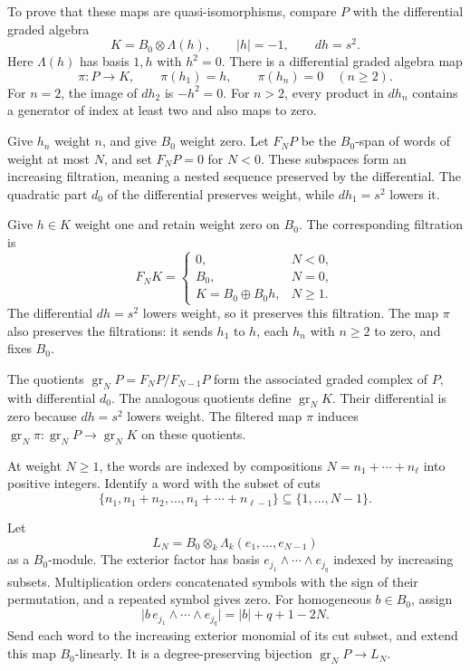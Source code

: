To prove that these maps are quasi-isomorphisms, compare $P$ with
the differential graded algebra
\[
 K=B_0\otimes\Lambda(h),\qquad |h|=-1,\qquad dh=s^2.
\]
Here $\Lambda(h)$ has basis $1,h$ with $h^2=0$.
There is a differential graded algebra map
\[
 \pi:P\longrightarrow K,\qquad
 \pi(h_1)=h,\qquad\pi(h_n)=0\quad(n\geq2).
\]
For $n=2$, the image of $dh_2$ is $-h^2=0$.
For $n>2$, every product in $dh_n$ contains a generator of index
at least two and also maps to zero.

Give $h_n$ weight $n$, and give $B_0$ weight zero.
Let $F_NP$ be the $B_0$-span of words of weight at most $N$,
and set $F_NP=0$ for $N<0$.
These subspaces form an increasing filtration, meaning a nested
sequence preserved by the differential.
The quadratic part $d_0$ of the differential preserves weight,
while $dh_1=s^2$ lowers it.

Give $h\in K$ weight one and retain weight zero on $B_0$.
The corresponding filtration is
\[
 F_NK=
 \begin{cases}
 0,&N<0,\\
 B_0,&N=0,\\
 K=B_0\oplus B_0h,&N\geq1.
 \end{cases}
\]
The differential $dh=s^2$ lowers weight, so it preserves this
filtration. The map $\pi$ also preserves the filtrations:
it sends $h_1$ to $h$, each $h_n$ with $n\geq2$ to zero,
and fixes $B_0$.

The quotients $\operatorname{gr}_NP=F_NP/F_{N-1}P$ form the
associated graded complex of $P$, with differential $d_0$.
The analogous quotients define $\operatorname{gr}_NK$.
Their differential is zero because $dh=s^2$ lowers weight.
The filtered map $\pi$ induces
$\operatorname{gr}_N\pi:\operatorname{gr}_NP\to
\operatorname{gr}_NK$ on these quotients.

At weight $N\geq1$, the words are indexed by compositions
$N=n_1+\cdots+n_\ell$ into positive integers.
Identify a word with the subset of cuts
\[
 \{n_1,n_1+n_2,\ldots,n_1+\cdots+n_{\ell-1}\}
 \subseteq\{1,\ldots,N-1\}.
\]

Let
\[
 L_N=B_0\otimes_k\Lambda_k(e_1,\ldots,e_{N-1})
\]
as a $B_0$-module.
The exterior factor has basis $e_{j_1}\wedge\cdots\wedge e_{j_q}$
indexed by increasing subsets. Multiplication orders concatenated
symbols with the sign of their permutation, and a repeated symbol
gives zero.
For homogeneous $b\in B_0$, assign
\[
 \bigl|b\,e_{j_1}\wedge\cdots\wedge e_{j_q}\bigr|
 =|b|+q+1-2N.
\]
Send each word to the increasing exterior monomial of its cut
subset, and extend this map $B_0$-linearly.
It is a degree-preserving bijection $\operatorname{gr}_NP\to L_N$.

